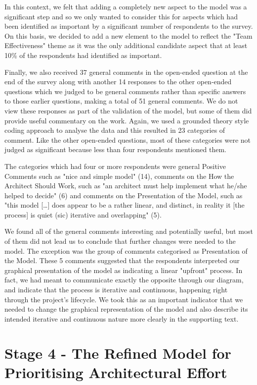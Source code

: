 In this context, we felt that adding a completely new aspect to the model was a significant step and so we only wanted to consider this for aspects which had been identified as important by a significant number of respondents to the survey.  On this basis, we decided to add a new element to the model to reflect the "Team Effectiveness" theme as it was the only additional candidate aspect that at least 10\% of the respondents had identified as important.

Finally, we also received 37 general comments in the open-ended question at the end of the survey along with another 14 responses to the other open-ended questions which we judged to be general comments rather than specific answers to those earlier questions, making a total of 51 general comments.  We do not view these responses as part of the validation of the model, but some of them did provide useful commentary on the work.  Again, we used a grounded theory style coding approach to analyse the data and this resulted in 23 categories of comment.  Like the other open-ended questions, most of these categories were not judged as significant because less than four respondents mentioned them.

The categories which had four or more respondents were general Positive Comments such as "nice and simple model" (14), comments on the How the Architect Should Work, such as "an architect must help implement what he/she helped to decide" (6) and comments on the Presentation of the Model, such as "this model […] does appear to be a rather linear, and distinct,  in reality it [the process] is quiet (sic) iterative and overlapping" (5).

We found all of the general comments interesting and potentially useful, but most of them did not lead us to conclude that further changes were needed to the model.  The exception was the group of comments categorised as Presentation of the Model.  These 5 comments suggested that the respondents interpreted our graphical presentation of the model as indicating a linear "upfront" process.  In fact, we had meant to communicate exactly the opposite through our diagram, and indicate that the process is iterative and continuous, happening right through the project's lifecycle.  We took this as an important indicator that we needed to change the graphical representation of the model and also describe its intended iterative and continuous nature more clearly in the supporting text.

\section{Stage 4 - The Refined Model for Prioritising Architectural Effort}

